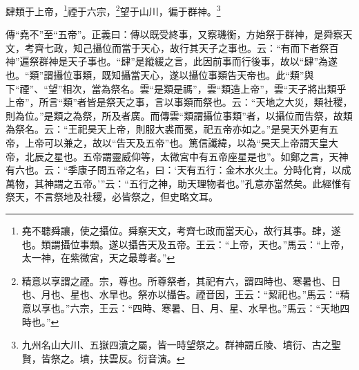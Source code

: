 肆類于上帝，\footnote{堯不聽舜讓，使之攝位。舜察天文，考齊七政而當天心，故行其事。肆，遂也。類謂攝位事類。遂以攝告天及五帝。王云：“上帝，天也。”馬云：“上帝，太一神，在紫微宮，天之最尊者。”}禋于六宗，\footnote{精意以享謂之禋。宗，尊也。所尊祭者，其祀有六，謂四時也、寒暑也、日也、月也、星也、水旱也。祭亦以攝告。禋音因，王云：“絜祀也。”馬云：“精意以享也。”六宗，王云：“四時、寒暑、日、月、星、水旱也。”馬云：“天地四時也。”}望于山川，徧于群神。\footnote{九州名山大川、五嶽四瀆之屬，皆一時望祭之。群神謂丘陵、墳衍、古之聖賢，皆祭之。墳，扶雲反。衍音演。}

{\noindent\zhuan{}\fzbyks 傳“堯不”至“五帝”。正義曰：傳以既受終事，又察璣衡，方始祭于群神，是舜察天文，考齊七政，知己攝位而當于天心，故行其天子之事也。云：“有而下者祭百神”遍祭群神是天子事也。“肆”是縱緩之言，此因前事而行後事，故以“肆”為遂也。“類”謂攝位事類，既知攝當天心，遂以攝位事類告天帝也。此“類”與下“禋”、“望”相次，當為祭名。雲“是類是禡”，雲“類造上帝”，雲“天子將出類乎上帝”，所言“類”者皆是祭天之事，言以事類而祭也。云：“天地之大災，類社稷，則為位。”是類之為祭，所及者廣。而傳雲“類謂攝位事類”者，以攝位而告祭，故類為祭名。云：“王祀昊天上帝，則服大裘而冕，祀五帝亦如之。”是昊天外更有五帝，上帝可以兼之，故以“告天及五帝”也。篤信讖緯，以為“昊天上帝謂天皇大帝，北辰之星也。五帝謂靈威仰等，太微宮中有五帝座星是也”。如鄭之言，天神有六也。云：“季康子問五帝之名，曰：‘天有五行：金木水火土。分時化育，以成萬物，其神謂之五帝。’”云：“五行之神，助天理物者也。”孔意亦當然矣。此經惟有祭天，不言祭地及社稷，必皆祭之，但史略文耳。 \par}


